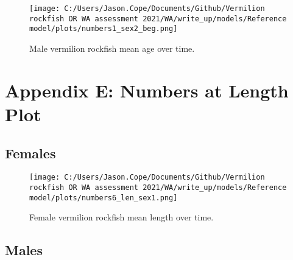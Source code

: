 \documentclass[11pt,
  english,
  a4paper,
]{article}
\begin{document}
\leavevmode\tagmcend\tagstructend


\begin{figure}
\centering
\texttt{[image: C:/Users/Jason.Cope/Documents/Github/Vermilion rockfish OR WA assessment 2021/WA/write\_up/models/Reference model/plots/numbers1\_sex2\_beg.png]}
\caption{Male vermilion rockfish mean age over time.\label{fig:num_age_males}}
\end{figure}

\tagmcend\tagstructend

\clearpage


\hypertarget{app-e}{%
\section{Appendix E: Numbers at Length Plot}\label{app-e}}

\leavevmode\tagmcend\tagstructend


\hypertarget{females-1}{%
\subsection{Females}\label{females-1}}

\leavevmode\tagmcend\tagstructend


\begin{figure}
\centering
\texttt{[image: C:/Users/Jason.Cope/Documents/Github/Vermilion rockfish OR WA assessment 2021/WA/write\_up/models/Reference model/plots/numbers6\_len\_sex1.png]}
\caption{Female vermilion rockfish mean length over time.\label{fig:num_lts_females}}
\end{figure}

\tagmcend\tagstructend

\clearpage


\hypertarget{males-1}{%
\subsection{Males}\label{males-1}}
\end{document}

